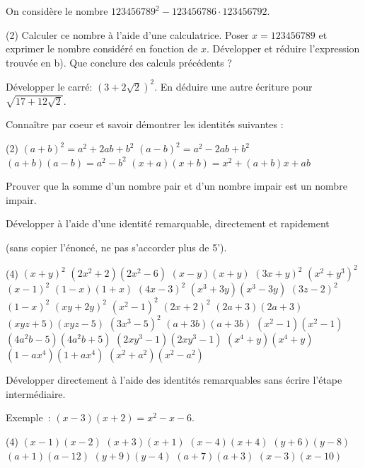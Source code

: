 \documentclass[a4paper,12pt]{report}
\begin{document}
\begin{acti}
On considère le nombre $123456789^2-123456786 \cdot 123456792$.
\begin{tasks}(2)
\task Calculer ce nombre à l'aide d'une calculatrice.
\task Poser $x=123456789$ et exprimer le nombre considéré en fonction de $x$.
\task Développer et réduire l'expression trouvée en b).
\task Que conclure des calculs précédents ?
\end{tasks}	
\end{acti}
\begin{acti}
Développer le carré: $(3+2 \sqrt{2})^2$. En déduire une autre écriture pour $\sqrt{17+12 \sqrt{2}}$.
\end{acti}
\begin{exo}
Connaître par coeur et savoir démontrer les identités suivantes :
\begin{tasks}(2)
\task $(a+b)^2=a^2+2 a b+b^2$
\task $(a-b)^2=a^2-2 a b+b^2$
\task $(a+b)(a-b)=a^2-b^2$
\task $(x+a)(x+b)=x^2+(a+b) x+a b$
\end{tasks}
\end{exo}
\begin{exo}
Prouver que la somme d'un nombre pair et d'un nombre impair est un nombre impair.
\end{exo}
\begin{exo}
Développer à l'aide d'une identité remarquable, directement et rapidement 

(sans copier l'énoncé, ne pas s'accorder plus de 5').
	\begin{tasks}(4)
\task $(x+y)^2$
\task $(2x^2+2)(2x^2-6)$
\task $(x-y)(x+y)$
\task $(3 x+y)^2$
\task $\left(x^2+y^3\right)^2$
\task $(x-1)^2$
\task $(1-x)(1+x)$
\task $(4 x-3)^2$
\task $\left(x^3+3 y\right)\left(x^3-3 y\right)$
\task $(3 z-2)^2$
\task $(1-x)^2$
\task $(x y+2 y)^2$
\task $\left(x^2-1\right)^2$
\task $(2 x+2)^2$
\task $(2 a+3)(2 a+3)$
\task $(x y z+5)(x y z-5)$
\task $\left(3 x^3-5\right)^2$
\task $(a+3 b)(a+3 b)$
\task $\left(x^2-1\right)\left(x^2-1\right)$
\task $\left(4 a^2 b-5\right)\left(4 a^2 b+5\right)$
\task $\left(2 x y^3-1\right)\left(2 x y^3-1\right)$
\task $\left(x^4+y\right)\left(x^4+y\right)$
\task $\left(1-a x^4\right)\left(1+a x^4\right)$
\task $\left(x^2+a^2\right)\left(x^2-a^2\right)$
	\end{tasks}
\end{exo}
\begin{exo}
Développer directement à l'aide des identités remarquables sans écrire l'étape intermédiaire.

Exemple~: $(x-3)(x+2)=x^2-x-6$.
	\begin{tasks}(4)
\task $(x-1)(x-2)$
\task $(x+3)(x+1)$
\task $(x-4)(x+4)$
\task $(y+6)(y-8)$
\task $(a+1)(a-12)$
\task $(y+9)(y-4)$
\task $(a+7)(a+3)$
\task $(x-3)(x-10)$
	\end{tasks}
\end{exo}
\end{document}
